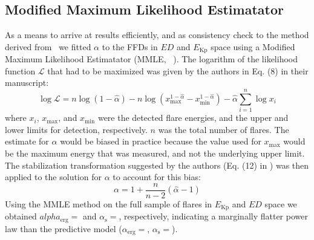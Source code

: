 \documentclass{aa}
\begin{document}
\begin{appendix}
\section{Modified Maximum Likelihood Estimatator}
\label{MMLE}
As a means to arrive at results efficiently, and as consistency check to the method derived from~\citet{wheatland_flaresbayes_2004} we fitted $\alpha$ to the FFDs in $ED$ and $E_\mathrm{Kp}$ space using a Modified Maximum Likelihood Estimatator (MMLE,~ \citealt{maschberger_powerlaw_2009}). The logarithm of the likelihood function $\mathcal{L}$ that had to be maximized was given by the authors in Eq. (8) in their manuscript:
\begin{equation}
\log \mathcal{L} = n \log (1-\hat{\alpha})-n \log\left(x_\mathrm{max}^{1-\hat{\alpha}}-x_\mathrm{min}^{1-\hat{\alpha}}\right) - \hat{\alpha} \displaystyle\sum_{i=1}^{n}\log x_i
\label{eqn:MLE}
\end{equation}
where $x_i$, $x_\mathrm{max}$, and $x_\mathrm{min}$ were the detected flare energies, and the upper and lower limits for detection, respectively. $n$ was the total number of flares. The estimate for $\alpha$ would be biased in practice because the value used for $x_\mathrm{max}$ would be the maximum energy that was measured, and not the underlying upper limit. The stabilization transformation suggested by the authors (Eq. (12) in \citealt{maschberger_powerlaw_2009}) was then applied to the solution for $\alpha$ to account for this bias:
\begin{equation}
\alpha = 1 + \dfrac{n}{n-2}(\hat{\alpha} - 1)
\label{eqn:MLE_stabilize}
\end{equation}
Using the MMLE method on the full sample of flares in $E_\mathrm{Kp}$ and $ED$ space we obtained $alpha_\mathrm{erg}=$ and $\alpha_\mathrm{s}=$, respectively, indicating a marginally flatter power law than the predictive model ($\alpha_\mathrm{erg}=$, $\alpha_\mathrm{s}=$).
\end{appendix}
\end{document}
